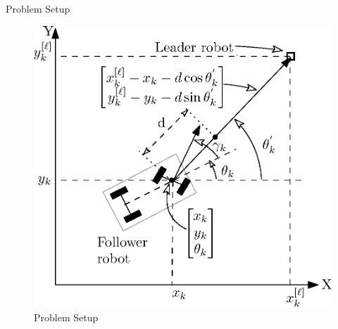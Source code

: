 \documentclass{beamer}
\begin{document}
\begin{frame}{Problem Setup}

\begin{figure}
\includegraphics[scale=0.6]{figs/ipe/LF-Setup.eps}
\caption{Problem Setup}
\end{figure}
\end{frame}
\end{document}
